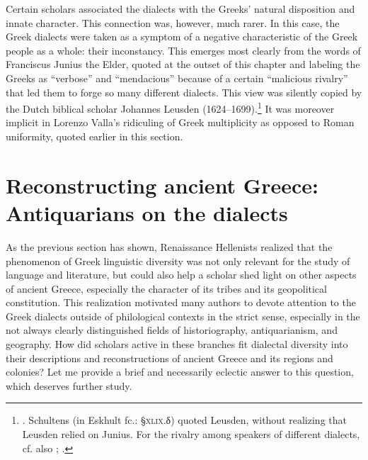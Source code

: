 Certain scholars associated the dialects with the Greeks’ natural disposition and innate character. This connection was, however, much rarer. In this case, the Greek dialects were taken as a symptom of a negative characteristic of the Greek people as a whole: their inconstancy. This emerges most clearly from the words of Franciscus Junius the Elder, quoted at the outset of this chapter and labeling the Greeks as “verbose” and “mendacious” because of a certain “malicious rivalry” that led them to forge so many different dialects. This view was silently copied by the Dutch biblical scholar Johannes Leusden (1624–1699).\footnote{\citet[a.4\textsc{\textsuperscript{r}}\textsc{–}a.4\textsc{\textsuperscript{v}}, 167]{Leusden1656}. Schultens (in Eskhult fc.: §\textsc{xlix.}δ) quoted Leusden, without realizing that Leusden relied on Junius. For the rivalry among speakers of different dialects, cf. also \citet[5\textsc{\textsuperscript{r}}]{Baile1588}; \citet[\textsc{b.3}\textsc{\textsuperscript{r}}]{Schorling1678}.} It was moreover implicit in Lorenzo Valla’s ridiculing of Greek multiplicity as opposed to Roman uniformity, quoted earlier in this section.

\section{Reconstructing ancient Greece: Antiquarians on the dialects}\label{sec:7.6}


As the previous section has shown, Renaissance Hellenists realized that the phenomenon of Greek linguistic diversity was not only relevant for the study of language and literature, but could also help a scholar shed light on other aspects of ancient Greece, especially the character of its tribes and its geopolitical constitution. This realization motivated many authors to devote attention to the Greek dialects outside of philological contexts in the strict sense, especially in the not always clearly distinguished fields of historiography, antiquarianism, and geography. How did scholars active in these branches fit dialectal diversity into their descriptions and reconstructions of ancient Greece and its regions and colonies? Let me provide a brief and necessarily eclectic answer to this question, which deserves further study.

